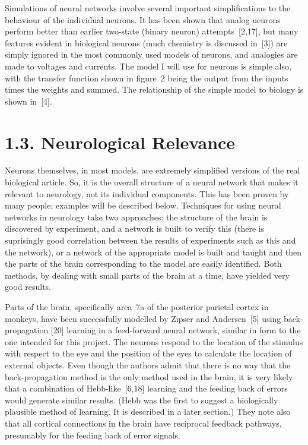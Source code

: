 \documentclass[12pt]{report}
\begin{document}
Simulations of neural networks involve several important simplifications to the
behaviour of the individual neurons.
It has been shown that analog neurons perform better than earlier 
two-state (binary neuron) attempts~[2,17], but many features evident in 
biological neurons %
(much chemistry is discussed in~[3])
are simply ignored in the most commonly used models of neurons, and analogies
are made to voltages and currents.
The model I will use for neurons is simple also, with the transfer
function shown in figure~2 being the output from the inputs times the
weights and summed.
The relationship of the simple model to biology is shown in~[4].

\section{1.3. Neurological Relevance}

Neurons themselves, in most models, are extremely simplified versions of
the real biological article.
So, it is the overall structure of a neural network that makes it relevant to
neurology, not its individual components.
This has been proven by many people; examples will be described
below.
Techniques for using neural networks in neurology take two approaches: the structure of the
brain is discovered by experiment, and a network is built to verify this
(there is suprisingly good correlation between the results of
experiments such as this and the network), or a network of the
appropriate model is built and taught and then the parts of the brain
corresponding to the model are easily identified.
Both methods, by dealing with small parts of the brain at a time, have
yielded very good results.

Parts of the brain, specifically area~7a of the posterior parietal
cortex in monkeys, have been successfully modelled by Zipser and
Andersen~[5] using
back-propagation [20] learning in a feed-forward neural network, similar in form to the
one intended for this project.
The neurons respond to the location of the stimulus with respect to the
eye and the position of the eyes to calculate the location of external
objects.
Even though the authors admit that there is no way
that the back-propagation method is the only method used in the brain,
it is very likely that a combination of Hebb-like~[6,18] learning and
the feeding back of errors would generate similar results. (Hebb was the
first to suggest a biologically plausible method of learning. 
It is described in a later section.)
They note also that all cortical connections in the brain have
reciprocal feedback pathways, presumably for the feeding back of error
signals.
\end{document}
